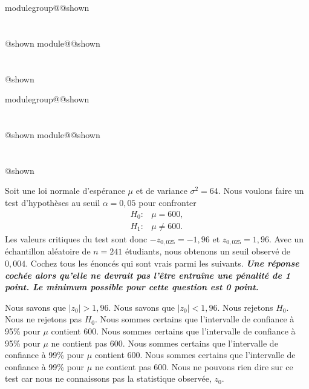 \documentclass{Evaluation}
\makeatletter
\newcommand{\currentmodulekey}{}
\newcommand{\currentmoduletitle}{}
\newcommand{\currentgroupkey}{}
\newcommand{\currentgrouptitle}{}
\newcommand{\showmoduleifneeded}{%
  \ifx\currentgroupkey\empty\else
    \expandafter\ifx\csname modulegroup@\currentgroupkey @shown\endcsname\relax
      \section*{\currentgrouptitle}%
      \expandafter\gdef\csname modulegroup@\currentgroupkey @shown\endcsname{1}%
    \fi
  \fi
  \expandafter\ifx\csname module@\currentmodulekey @shown\endcsname\relax
    \section*{\currentmoduletitle}%
    \expandafter\gdef\csname module@\currentmodulekey @shown\endcsname{1}%
  \fi
}
\newenvironment{A23}{\showmoduleifneeded}{}
\newenvironment{H26}{\showmoduleifneeded}{}
\makeatother
\begin{document}
\begin{questions}
\begin{H26}
\end{H26}

\begin{A23}
\question {} %
Soit une loi normale d'espérance $\mu$ et de variance $\sigma^2=64$.
Nous voulons faire un test d'hypothèses au seuil $\alpha=0,05$ pour confronter 
\begin{align*}
    H_0:&\mu=600,\\
    H_1:&\mu\neq 600.
\end{align*} 
Les valeurs critiques du test sont donc $-z_{0,025}=-1,96$ et $z_{0,025}=1,96$.
Avec un échantillon aléatoire de $n=241$ étudiants, nous obtenons un seuil observé de $0,004$. 
Cochez tous les énoncés qui sont vrais parmi les suivants. \textit{\textbf{Une réponse cochée alors qu'elle ne devrait pas l'être entraîne une pénalité de 1 point. Le minimum possible pour cette question est 0 point.}}
 
\begin{checkboxes}
\correctchoice Nous savons que $|z_0|>1,96$.
\choice Nous savons que $|z_0|<1,96$.
\correctchoice Nous rejetons $H_0$.
\choice Nous ne rejetons pas $H_0$.
\choice Nous sommes certains que l'intervalle de confiance à 95\% pour $\mu$ contient 600.
\correctchoice Nous sommes certains que l'intervalle de confiance à 95\% pour $\mu$ ne contient pas 600.
\choice Nous sommes certains que l'intervalle de confiance à 99\% pour $\mu$
 contient 600.
\choice Nous sommes certains que l'intervalle de confiance à 99\% pour $\mu$ ne contient pas 600.
\choice Nous ne pouvons rien dire sur ce test car nous ne connaissons pas la statistique observée, $z_0$.
\end{checkboxes}
\end{A23}


\end{questions}
\end{document}
